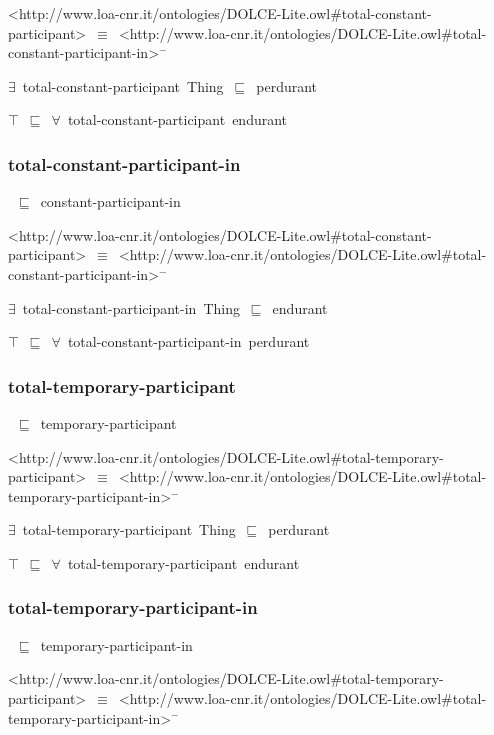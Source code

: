 \documentclass{article}
\begin{document}
<http://www.loa-cnr.it/ontologies/DOLCE-Lite.owl#total-constant-participant>~\ensuremath{\equiv}~<http://www.loa-cnr.it/ontologies/DOLCE-Lite.owl#total-constant-participant-in>\ensuremath{^-}

\ensuremath{\exists}~total-constant-participant~Thing~\ensuremath{\sqsubseteq}~perdurant

\ensuremath{\top}~\ensuremath{\sqsubseteq}~\ensuremath{\forall}~total-constant-participant~endurant

\subsubsection*{total-constant-participant-in}

~\ensuremath{\sqsubseteq}~constant-participant-in

<http://www.loa-cnr.it/ontologies/DOLCE-Lite.owl#total-constant-participant>~\ensuremath{\equiv}~<http://www.loa-cnr.it/ontologies/DOLCE-Lite.owl#total-constant-participant-in>\ensuremath{^-}

\ensuremath{\exists}~total-constant-participant-in~Thing~\ensuremath{\sqsubseteq}~endurant

\ensuremath{\top}~\ensuremath{\sqsubseteq}~\ensuremath{\forall}~total-constant-participant-in~perdurant

\subsubsection*{total-temporary-participant}

~\ensuremath{\sqsubseteq}~temporary-participant

<http://www.loa-cnr.it/ontologies/DOLCE-Lite.owl#total-temporary-participant>~\ensuremath{\equiv}~<http://www.loa-cnr.it/ontologies/DOLCE-Lite.owl#total-temporary-participant-in>\ensuremath{^-}

\ensuremath{\exists}~total-temporary-participant~Thing~\ensuremath{\sqsubseteq}~perdurant

\ensuremath{\top}~\ensuremath{\sqsubseteq}~\ensuremath{\forall}~total-temporary-participant~endurant

\subsubsection*{total-temporary-participant-in}

~\ensuremath{\sqsubseteq}~temporary-participant-in

<http://www.loa-cnr.it/ontologies/DOLCE-Lite.owl#total-temporary-participant>~\ensuremath{\equiv}~<http://www.loa-cnr.it/ontologies/DOLCE-Lite.owl#total-temporary-participant-in>\ensuremath{^-}
\end{document}
